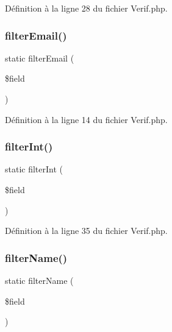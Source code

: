 Définition à la ligne 28 du fichier Verif.\+php.

\mbox{\label{class_app_1_1_verif_ad27d2a83b777170b7a7309c28b0b6976}} 
\subsubsection{\texorpdfstring{filter\+Email()}{filterEmail()}}
{\footnotesize\ttfamily static filter\+Email (\begin{DoxyParamCaption}\item[{}]{\$field }\end{DoxyParamCaption})\hspace{0.3cm}{\ttfamily [static]}}



Définition à la ligne 14 du fichier Verif.\+php.

\mbox{\label{class_app_1_1_verif_abb832f72a01d33d452acfc2f67bc776f}} 
\subsubsection{\texorpdfstring{filter\+Int()}{filterInt()}}
{\footnotesize\ttfamily static filter\+Int (\begin{DoxyParamCaption}\item[{}]{\$field }\end{DoxyParamCaption})\hspace{0.3cm}{\ttfamily [static]}}



Définition à la ligne 35 du fichier Verif.\+php.

\mbox{\label{class_app_1_1_verif_ae66ae460929735528668ff5a64355e1c}} 
\subsubsection{\texorpdfstring{filter\+Name()}{filterName()}}
{\footnotesize\ttfamily static filter\+Name (\begin{DoxyParamCaption}\item[{}]{\$field }\end{DoxyParamCaption})\hspace{0.3cm}{\ttfamily [static]}}



